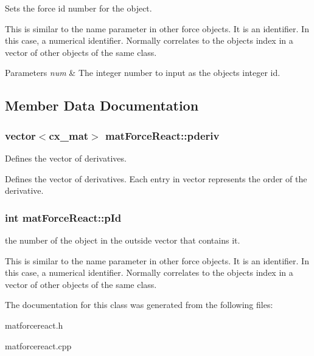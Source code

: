 Sets the force id number for the object. 

This is similar to the name parameter in other force objects. It is an identifier. In this case, a numerical identifier. Normally correlates to the objects index in a vector of other objects of the same class. 
\begin{DoxyParams}{Parameters}
{\em num} & The integer number to input as the objects integer id. \\
\hline
\end{DoxyParams}


\subsection{Member Data Documentation}
\hypertarget{classmat_force_react_a5db9defc60eb6f70db077c7a3d2df9c3}{
\subsubsection[{pderiv}]{\setlength{\rightskip}{0pt plus 5cm}vector$<$cx\-\_\-mat$>$ mat\-Force\-React\-::pderiv\hspace{0.3cm}{\ttfamily [protected]}}}\label{classmat_force_react_a5db9defc60eb6f70db077c7a3d2df9c3}


Defines the vector of derivatives. 

Defines the vector of derivatives. Each entry in vector represents the order of the derivative. \hypertarget{classmat_force_react_af1d3dfa9851be6963b19c2738e3ba241}{
\subsubsection[{p\-Id}]{\setlength{\rightskip}{0pt plus 5cm}int mat\-Force\-React\-::p\-Id\hspace{0.3cm}{\ttfamily [protected]}}}\label{classmat_force_react_af1d3dfa9851be6963b19c2738e3ba241}


the number of the object in the outside vector that contains it. 

This is similar to the name parameter in other force objects. It is an identifier. In this case, a numerical identifier. Normally correlates to the objects index in a vector of other objects of the same class. 

The documentation for this class was generated from the following files\-:\begin{DoxyCompactItemize}
\item 
matforcereact.\-h\item 
matforcereact.\-cpp\end{DoxyCompactItemize}
